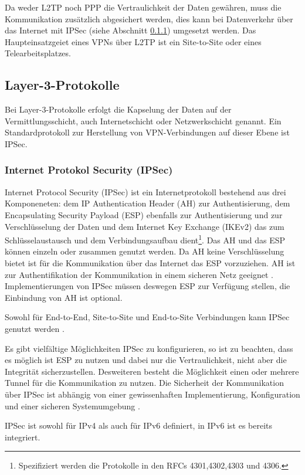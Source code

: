 Da weder L2TP noch PPP die Vertraulichkeit der Daten gewähren, muss die Kommunikation zusätzlich abgesichert werden, dies kann bei Datenverkehr über das Internet mit IPSec (siehe Abschnitt \ref{subsub:L3}) umgesetzt werden. 
Das Haupteinsatzgeiet eines VPNs über L2TP ist ein Site-to-Site oder eines Telearbeitsplatzes.   

\subsection{Layer-3-Protokolle}
Bei Layer-3-Protokolle erfolgt die Kapselung der Daten auf der Vermittlungsschicht, auch Internetschicht oder Netzwerkschicht genannt. Ein Standardprotokoll zur Herstellung von VPN-Verbindungen auf dieser Ebene ist IPSec.

\subsubsection{Internet Protokol Security (IPSec)}
\label{subsub:L3}
Internet Protocol Security (IPSec) ist ein Internetprotokoll bestehend aus drei Komponeneten: dem IP Authentication Header (AH) zur Authentisierung, dem Encapsulating Security Payload (ESP) ebenfalls zur Authentisierung und zur Verschlüsselung der Daten und dem Internet Key Exchange (IKEv2) das zum Schlüsselaustausch und dem Verbindungsaufbau dient\footnote{Spezifiziert werden die Protokolle in den RFCs 4301,4302,4303 und 4306.}. Das AH und das ESP können einzeln oder zusammen genutzt werden. Da AH keine Verschlüsselung bietet ist für die Kommunikation über das Internet das ESP vorzuziehen. AH ist zur Authentifikation der Kommunikation in einem sicheren Netz geeignet \cite{isi-vpn}. Implementierungen von IPSec müssen deswegen ESP zur Verfügung stellen, die Einbindung von AH ist optional.

Sowohl für End-to-End, Site-to-Site und End-to-Site Verbindungen kann IPSec genutzt werden \cite{rfc4301}.

 Es gibt vielfältige Möglichkeiten IPSec zu konfigurieren, so ist zu beachten, dass es möglich ist ESP zu nutzen und dabei nur die Vertraulichkeit, nicht aber die Integrität sicherzustellen. Desweiteren besteht die Möglichkeit einen oder mehrere Tunnel für die Kommunikation zu nutzen. Die Sicherheit der Kommunikation  über IPSec ist abhängig von einer gewissenhaften Implementierung, Konfiguration und einer sicheren Systemumgebung \cite{rfc4301}. 
  
  IPSec ist sowohl für IPv4 als auch für IPv6 definiert, in IPv6 ist es bereits integriert.
\\

